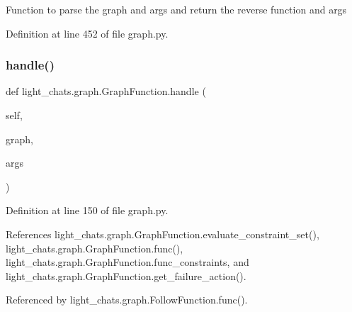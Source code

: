 \begin{DoxyVerb}Function to parse the graph and args and return the reverse
function and args\end{DoxyVerb}
 

Definition at line 452 of file graph.\+py.

\mbox{\label{classlight__chats_1_1graph_1_1GraphFunction_a21e2dd1c8eb431b3ee22cce4853e3c15}} 
\subsubsection{\texorpdfstring{handle()}{handle()}}
{\footnotesize\ttfamily def light\+\_\+chats.\+graph.\+Graph\+Function.\+handle (\begin{DoxyParamCaption}\item[{}]{self,  }\item[{}]{graph,  }\item[{}]{args }\end{DoxyParamCaption})}



Definition at line 150 of file graph.\+py.



References light\+\_\+chats.\+graph.\+Graph\+Function.\+evaluate\+\_\+constraint\+\_\+set(), light\+\_\+chats.\+graph.\+Graph\+Function.\+func(), light\+\_\+chats.\+graph.\+Graph\+Function.\+func\+\_\+constraints, and light\+\_\+chats.\+graph.\+Graph\+Function.\+get\+\_\+failure\+\_\+action().



Referenced by light\+\_\+chats.\+graph.\+Follow\+Function.\+func().

